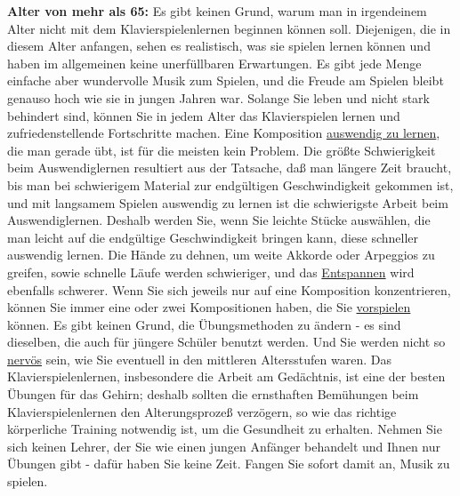 \hypertarget{c1iii18c65}{}

\textbf{Alter von mehr als 65:}
Es gibt keinen Grund, warum man in irgendeinem Alter nicht mit dem Klavierspielenlernen beginnen können soll.
Diejenigen, die in diesem Alter anfangen, sehen es realistisch, was sie spielen lernen können und haben im allgemeinen keine unerfüllbaren Erwartungen.
Es gibt jede Menge einfache aber wundervolle Musik zum Spielen, und die Freude am Spielen bleibt genauso hoch wie sie in jungen Jahren war.
Solange Sie leben und nicht stark behindert sind, können Sie in jedem Alter das Klavierspielen lernen und zufriedenstellende Fortschritte machen.
Eine Komposition \hyperlink{c1iii6}{auswendig zu lernen}, die man gerade übt, ist für die meisten kein Problem.
Die größte Schwierigkeit beim Auswendiglernen resultiert aus der Tatsache, daß man längere Zeit braucht, bis man bei schwierigem Material zur endgültigen Geschwindigkeit gekommen ist, und mit langsamem Spielen auswendig zu lernen ist die schwierigste Arbeit beim Auswendiglernen.
Deshalb werden Sie, wenn Sie leichte Stücke auswählen, die man leicht auf die endgültige Geschwindigkeit bringen kann, diese schneller auswendig lernen.
Die Hände zu dehnen, um weite Akkorde oder Arpeggios zu greifen, sowie schnelle Läufe werden schwieriger, und das \hyperlink{c1ii14}{Entspannen} wird ebenfalls schwerer.
Wenn Sie sich jeweils nur auf eine Komposition konzentrieren, können Sie immer eine oder zwei Kompositionen haben, die Sie \hyperlink{c1iii14}{vorspielen} können.
Es gibt keinen Grund, die Übungsmethoden zu ändern - es sind dieselben, die auch für jüngere Schüler benutzt werden.
Und Sie werden nicht so \hyperlink{c1iii15}{nervös} sein, wie Sie eventuell in den mittleren Altersstufen waren.
Das Klavierspielenlernen, insbesondere die Arbeit am Gedächtnis, ist eine der besten Übungen für das Gehirn; deshalb sollten die ernsthaften Bemühungen beim Klavierspielenlernen den Alterungsprozeß verzögern, so wie das richtige körperliche Training notwendig ist, um die Gesundheit zu erhalten.
Nehmen Sie sich keinen Lehrer, der Sie wie einen jungen Anfänger behandelt und Ihnen nur Übungen gibt - dafür haben Sie keine Zeit.
Fangen Sie sofort damit an, Musik zu spielen.



